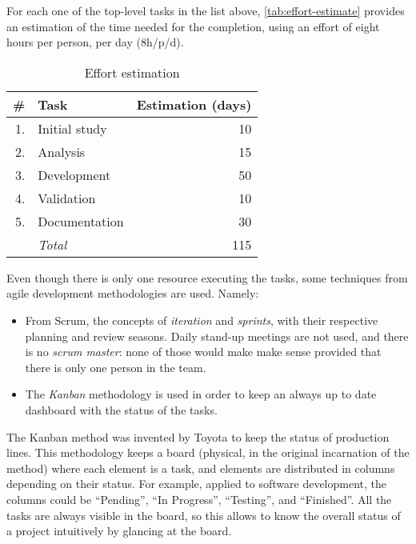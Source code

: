 For each one of the top-level tasks in the list above,
\autoref{tab:effort-estimate} provides an estimation of the time needed for
the completion, using an effort of eight hours per person, per day (8h/p/d).

\begin{table}
	\centering
	\begin{tabular}{rlr}
		\toprule
		\# & Task & Estimation (days) \\
		\midrule
		1. & Initial study     & 10 \\
		2. & Analysis          & 15 \\
		3. & Development       & 50 \\
		4. & Validation        & 10 \\
		5. & Documentation     & 30 \\
		\midrule
		   & \emph{Total}      & 115 \\
		\bottomrule
	\end{tabular}
	\caption{Effort estimation}
	\label{tab:effort-estimate}
\end{table}

Even though there is only one resource executing the tasks, some techniques
from agile development methodologies are used. Namely:

\begin{itemize}
	\item From Scrum, the concepts of \emph{iteration} and \emph{sprints}, with
    their respective planning and review seasons. Daily stand-up meetings are
    not used, and there is no \emph{scrum master}: none of those would make
    make sense provided that there is only one person in the team.
  \item The \emph{Kanban} methodology is used in order to keep an always
		up to date dashboard with the status of the tasks.
\end{itemize}

The Kanban method was invented by \gls{Toyota} to keep the status of
production lines. This methodology keeps a board (physical, in the original
incarnation of the method) where each element is a task, and elements are
distributed in columns depending on their status. For example, applied to
software development, the columns could be “Pending”, “In Progress”,
“Testing”, and “Finished”. All the tasks are always visible in the board, so
this allows to know the overall status of a project intuitively by glancing at
the board.


\beforeintro
